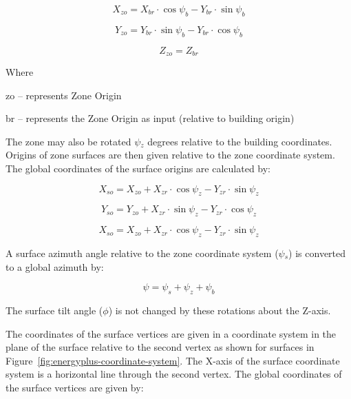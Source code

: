 \begin{equation}
{X_{zo}} = {X_{br}}\cdot \cos {\psi_b} - {Y_{br}}\cdot \sin {\psi_b}
\end{equation}

\begin{equation}
{Y_{zo}} = {Y_{br}}\cdot \sin {\psi_b} - {Y_{br}}\cdot \cos {\psi_b}
\end{equation}

\begin{equation}
{Z_{zo}} = {Z_{br}}
\end{equation}

Where

zo -- represents Zone Origin

br -- represents the Zone Origin as input (relative to building origin)

The zone may also be rotated $\psi$\(_{z}\) degrees relative to the building coordinates. Origins of zone surfaces are then given relative to the zone coordinate system. The global coordinates of the surface origins are calculated by:

\begin{equation}
{X_{so}} = {X_{zo}} + {X_{zr}}\cdot \cos {\psi_z} - {Y_{zr}}\cdot \sin {\psi_z}
\end{equation}

\begin{equation}
{Y_{so}} = {Y_{zo}} + {X_{zr}}\cdot \sin {\psi_z} - {Y_{zr}}\cdot \cos {\psi_z}
\end{equation}

\begin{equation}
{X_{so}} = {X_{zo}} + {X_{zr}}\cdot \cos {\psi_z} - {Y_{zr}}\cdot \sin {\psi_z}
\end{equation}

A surface azimuth angle relative to the zone coordinate system ($\psi$\(_{s}\)) is converted to a global azimuth by:

\begin{equation}
\psi  = {\psi_s} + {\psi_z} + {\psi_b}
\end{equation}

The surface tilt angle ($\phi$) is not changed by these rotations about the Z-axis.

The coordinates of the surface vertices are given in a coordinate system in the plane of the surface relative to the second vertex as shown for surfaces in Figure~\ref{fig:energyplus-coordinate-system}. The X-axis of the surface coordinate system is a horizontal line through the second vertex. The global coordinates of the surface vertices are given by:

